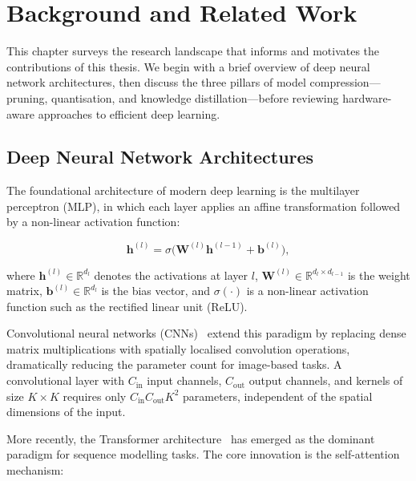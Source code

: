 \documentclass[12pt,a4paper,oneside]{book}
\begin{document}
\chapter{Background and Related Work}

This chapter surveys the research landscape that informs and motivates
the contributions of this thesis. We begin with a brief overview of deep
neural network architectures, then discuss the three pillars of model
compression---pruning, quantisation, and knowledge distillation---before
reviewing hardware-aware approaches to efficient deep learning.

\section{Deep Neural Network Architectures}

The foundational architecture of modern deep learning is the multilayer
perceptron (MLP), in which each layer applies an affine transformation
followed by a non-linear activation function:

\begin{equation}
\mathbf{h}^{(l)} = \sigma\!\bigl(\mathbf{W}^{(l)}\mathbf{h}^{(l-1)}
+ \mathbf{b}^{(l)}\bigr),
\label{eq:mlp}
\end{equation}

where $\mathbf{h}^{(l)} \in \mathbb{R}^{d_l}$ denotes the activations
at layer $l$, $\mathbf{W}^{(l)} \in \mathbb{R}^{d_l \times d_{l-1}}$ is
the weight matrix, $\mathbf{b}^{(l)} \in \mathbb{R}^{d_l}$ is the bias
vector, and $\sigma(\cdot)$ is a non-linear activation function such as
the rectified linear unit (ReLU).

Convolutional neural networks (CNNs)~\cite{he2016deep} extend this
paradigm by replacing dense matrix multiplications with spatially
localised convolution operations, dramatically reducing the parameter
count for image-based tasks. A convolutional layer with $C_{\text{in}}$
input channels, $C_{\text{out}}$ output channels, and kernels of size
$K \times K$ requires only $C_{\text{in}} C_{\text{out}} K^2$
parameters, independent of the spatial dimensions of the input.

More recently, the Transformer architecture~\cite{vaswani2017attention}
has emerged as the dominant paradigm for sequence modelling tasks. The
core innovation is the self-attention mechanism:
\end{document}
